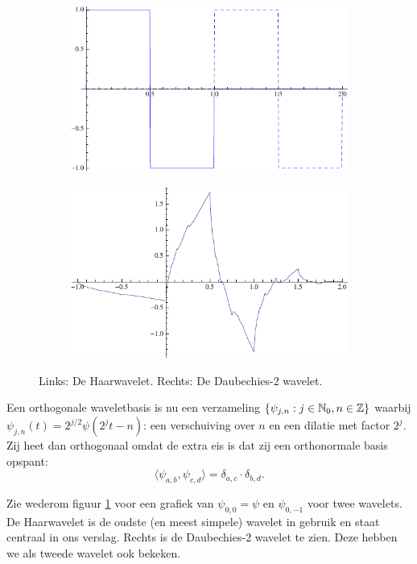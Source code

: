 \begin{figure}[h]
  \centering
  \begin{subfigure}{0.48\linewidth}
    \includegraphics[width=\linewidth]{plaatjes/db1.pdf}
  \end{subfigure}
  \begin{subfigure}{0.48\linewidth}
    \includegraphics[width=\linewidth]{plaatjes/db2_psi.pdf}
  \end{subfigure}
  \caption{Links: De Haarwavelet. Rechts: De Daubechies-2 wavelet.}
\label{fig:samenv}
\end{figure}

Een orthogonale waveletbasis is nu een verzameling $\{ \psi_{j,n}: j \in \mathbb{N}_0, n \in \mathbb{Z} \}$ waarbij $\psi_{j,n}(t) = 2^{j/2} \psi(2^jt - n)$: een verschuiving over $n$ en een dilatie met factor $2^j$. Zij heet dan orthogonaal omdat de extra eis is dat zij een orthonormale basis opspant: \[\langle \psi_{a,b}, \psi_{c,d} \rangle = \delta_{a,c} \cdot \delta_{b,d}.\]

Zie wederom figuur \ref{fig:samenv} voor een grafiek van $\psi_{0,0} = \psi$ en $\psi_{0,-1}$ voor twee wavelets. De Haarwavelet is de oudste (en meest simpele) wavelet in gebruik en staat centraal in ons verslag. Rechts is de Daubechies-2 wavelet te zien. Deze hebben we als tweede wavelet ook bekeken.

